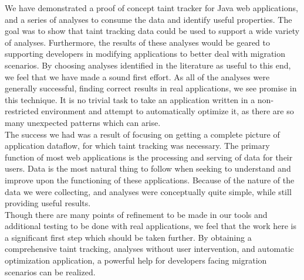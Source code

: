 \documentclass[msc,oneside]{ubcthesis}
\begin{document}
We have demonstrated a proof of concept taint tracker for Java web applications, and a series of analyses to consume the data and identify useful properties. The goal was to show that taint tracking data could be used to support a wide variety of analyses. Furthermore, the results of these analyses would be geared to supporting developers in modifying applications to better deal with migration scenarios. By choosing analyses identified in the literature as useful to this end, we feel that we have made a sound first effort. As all of the analyses were generally successful, finding correct results in real applications, we see promise in this technique. It is no trivial task to take an application written in a non-restricted environment and attempt to automatically optimize it, as there are so many unexpected patterns which can arise.\\

The success we had was a result of focusing on getting a complete picture of application dataflow, for which taint tracking was necessary. The primary function of most web applications is the processing and serving of data for their users. Data is the most natural thing to follow when seeking to understand and improve upon the functioning of these applications. Because of the nature of the data we were collecting, and analyses were conceptually quite simple, while still providing useful results.\\

Though there are many points of refinement to be made in our tools and additional testing to be done with real applications, we feel that the work here is a significant first step which should be taken further. By obtaining a comprehensive taint tracking, analyses without user intervention, and automatic optimization application, a powerful help for developers facing migration scenarios can be realized.


\end{document}
